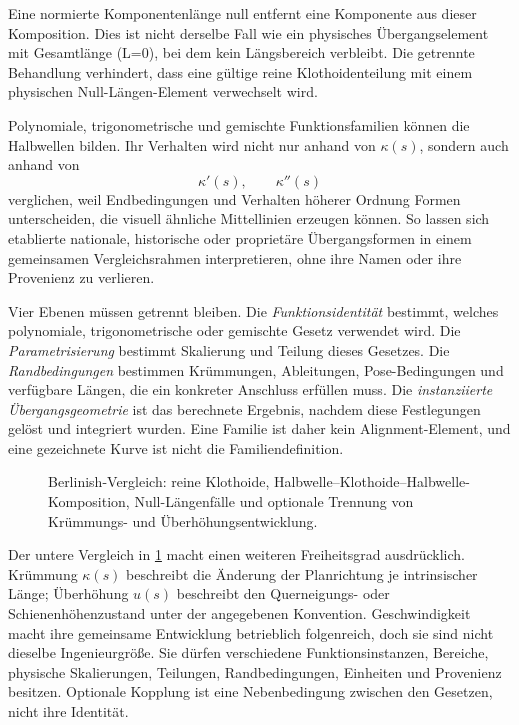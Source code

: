 Eine normierte Komponentenlänge null entfernt eine Komponente aus dieser
Komposition. Dies ist nicht derselbe Fall wie ein physisches Übergangselement
mit Gesamtlänge (L=0), bei dem kein Längsbereich verbleibt. Die getrennte
Behandlung verhindert, dass eine gültige reine Klothoidenteilung mit einem
physischen Null-Längen-Element verwechselt wird.

Polynomiale, trigonometrische und gemischte Funktionsfamilien können die
Halbwellen bilden. Ihr Verhalten wird nicht nur anhand von \(\kappa(s)\),
sondern auch anhand von
\[
\kappa'(s),\qquad \kappa''(s)
\]
verglichen, weil Endbedingungen und Verhalten höherer Ordnung Formen
unterscheiden, die visuell ähnliche Mittellinien erzeugen können. So lassen
sich etablierte nationale, historische oder proprietäre Übergangsformen in
einem gemeinsamen Vergleichsrahmen interpretieren, ohne ihre Namen oder ihre
Provenienz zu verlieren.

Vier Ebenen müssen getrennt bleiben. Die \emph{Funktionsidentität} bestimmt,
welches polynomiale, trigonometrische oder gemischte Gesetz verwendet wird.
Die \emph{Parametrisierung} bestimmt Skalierung und Teilung dieses Gesetzes.
Die \emph{Randbedingungen} bestimmen Krümmungen, Ableitungen,
Pose-Bedingungen und verfügbare Längen, die ein konkreter Anschluss erfüllen
muss. Die \emph{instanziierte Übergangsgeometrie} ist das berechnete Ergebnis,
nachdem diese Festlegungen gelöst und integriert wurden. Eine Familie ist
daher kein Alignment-Element, und eine gezeichnete Kurve ist nicht die
Familiendefinition.

\begin{figure}[ht]
\centering
\resizebox{\textwidth}{!}{}
\caption{Berlinish-Vergleich: reine Klothoide, Halbwelle--Klothoide--Halbwelle-Komposition, Null-Längenfälle und optionale Trennung von Krümmungs- und Überhöhungsentwicklung.}
\label{fig:berlinish-composition}
\end{figure}

Der untere Vergleich in \cref{fig:berlinish-composition} macht einen weiteren
Freiheitsgrad ausdrücklich. Krümmung \(\kappa(s)\) beschreibt die Änderung der
Planrichtung je intrinsischer Länge; Überhöhung \(u(s)\) beschreibt den
Querneigungs- oder Schienenhöhenzustand unter der angegebenen Konvention.
Geschwindigkeit macht ihre gemeinsame Entwicklung betrieblich folgenreich,
doch sie sind nicht dieselbe Ingenieurgröße. Sie dürfen verschiedene
Funktionsinstanzen, Bereiche, physische Skalierungen, Teilungen,
Randbedingungen, Einheiten und Provenienz besitzen. Optionale Kopplung ist
eine Nebenbedingung zwischen den Gesetzen, nicht ihre Identität.

